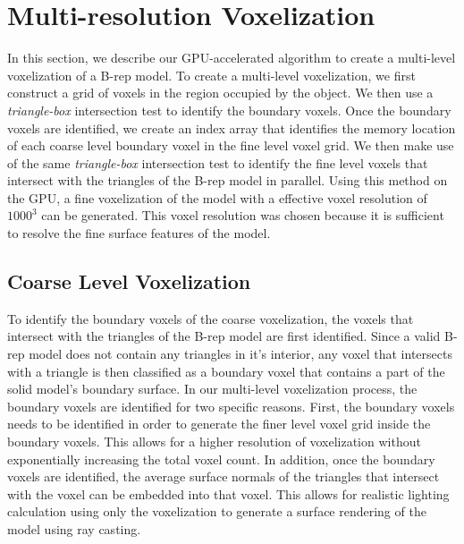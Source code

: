 \documentclass[10pt,letterpaper]{article}
\begin{document}
\section{Multi-resolution Voxelization}
\label{Sec:Voxelization}

In this section, we describe our GPU-accelerated algorithm to create a multi-level voxelization of a B-rep model. To create a multi-level voxelization, we first construct a grid of voxels in the region occupied by the object. We then use a \emph{triangle-box} intersection test to identify the boundary voxels. Once the boundary voxels are identified, we create an index array that identifies the memory location of each coarse level boundary voxel in the fine level voxel grid. We then make use of the same  \emph{triangle-box} intersection test to identify the fine level voxels that intersect with the triangles of the B-rep model in parallel. Using this method on the GPU, a fine voxelization of the model with a effective voxel resolution of $1000^3$ can be generated. This voxel resolution was chosen because it is sufficient to resolve the fine surface features of the model.

\subsection{Coarse Level Voxelization}
To identify the boundary voxels of the coarse voxelization, the voxels that intersect with the triangles of the B-rep model are first identified. Since a valid B-rep model does not contain any triangles in it's interior, any voxel that intersects with a triangle is then classified as a boundary voxel that contains a part of the solid model's boundary surface. In our multi-level voxelization process, the boundary voxels are identified for two specific reasons. First, the boundary voxels needs to be identified in order to generate the finer level voxel grid inside the boundary voxels. This allows for a higher resolution of voxelization without exponentially increasing the total voxel count. In addition, once the boundary voxels are identified, the average surface normals of the triangles that intersect with the voxel can be embedded into that voxel. This allows for realistic lighting calculation using only the voxelization to generate a surface rendering of the model using ray casting.
\end{document}

